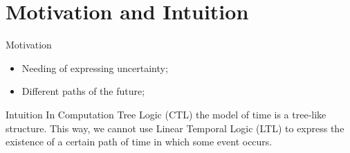 \section{Motivation and Intuition}
\begin{frame}{Motivation}
	\begin{itemize}
		\item 
		{
			Needing of expressing uncertainty;
			\pause
		} 
		\item 
		{
			Different paths of the future;
		}
	\end{itemize}
\end{frame}
\begin{frame}{Intuition}
	In Computation Tree Logic (CTL) the model of time is a tree-like structure. This way, we cannot use Linear Temporal Logic (LTL) to express the existence of a certain path of time in which some event occurs.
\end{frame}